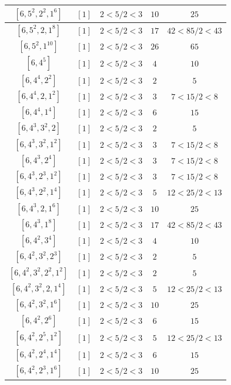 \documentclass{article}%
\begin{document}
\begin{center}
\begin{longtable}{||c|c|c|c|c||}
$[6, 5^{2}, 2^{2}, 1^{6}]$ & $[1]$ & $2 < 5/2 < 3$ & $10$ & $25$ \\ \hline 
$[6, 5^{2}, 2, 1^{8}]$ & $[1]$ & $2 < 5/2 < 3$ & $17$ & $42 < 85/2 < 43$ \\ \hline 
$[6, 5^{2}, 1^{10}]$ & $[1]$ & $2 < 5/2 < 3$ & $26$ & $65$ \\ \hline 
$[6, 4^{5}]$ & $[1]$ & $2 < 5/2 < 3$ & $4$ & $10$ \\ \hline 
$[6, 4^{4}, 2^{2}]$ & $[1]$ & $2 < 5/2 < 3$ & $2$ & $5$ \\ \hline 
$[6, 4^{4}, 2, 1^{2}]$ & $[1]$ & $2 < 5/2 < 3$ & $3$ & $7 < 15/2 < 8$ \\ \hline 
$[6, 4^{4}, 1^{4}]$ & $[1]$ & $2 < 5/2 < 3$ & $6$ & $15$ \\ \hline 
$[6, 4^{3}, 3^{2}, 2]$ & $[1]$ & $2 < 5/2 < 3$ & $2$ & $5$ \\ \hline 
$[6, 4^{3}, 3^{2}, 1^{2}]$ & $[1]$ & $2 < 5/2 < 3$ & $3$ & $7 < 15/2 < 8$ \\ \hline 
$[6, 4^{3}, 2^{4}]$ & $[1]$ & $2 < 5/2 < 3$ & $3$ & $7 < 15/2 < 8$ \\ \hline 
$[6, 4^{3}, 2^{3}, 1^{2}]$ & $[1]$ & $2 < 5/2 < 3$ & $3$ & $7 < 15/2 < 8$ \\ \hline 
$[6, 4^{3}, 2^{2}, 1^{4}]$ & $[1]$ & $2 < 5/2 < 3$ & $5$ & $12 < 25/2 < 13$ \\ \hline 
$[6, 4^{3}, 2, 1^{6}]$ & $[1]$ & $2 < 5/2 < 3$ & $10$ & $25$ \\ \hline 
$[6, 4^{3}, 1^{8}]$ & $[1]$ & $2 < 5/2 < 3$ & $17$ & $42 < 85/2 < 43$ \\ \hline 
$[6, 4^{2}, 3^{4}]$ & $[1]$ & $2 < 5/2 < 3$ & $4$ & $10$ \\ \hline 
$[6, 4^{2}, 3^{2}, 2^{3}]$ & $[1]$ & $2 < 5/2 < 3$ & $2$ & $5$ \\ \hline 
$[6, 4^{2}, 3^{2}, 2^{2}, 1^{2}]$ & $[1]$ & $2 < 5/2 < 3$ & $2$ & $5$ \\ \hline 
$[6, 4^{2}, 3^{2}, 2, 1^{4}]$ & $[1]$ & $2 < 5/2 < 3$ & $5$ & $12 < 25/2 < 13$ \\ \hline 
$[6, 4^{2}, 3^{2}, 1^{6}]$ & $[1]$ & $2 < 5/2 < 3$ & $10$ & $25$ \\ \hline 
$[6, 4^{2}, 2^{6}]$ & $[1]$ & $2 < 5/2 < 3$ & $6$ & $15$ \\ \hline 
$[6, 4^{2}, 2^{5}, 1^{2}]$ & $[1]$ & $2 < 5/2 < 3$ & $5$ & $12 < 25/2 < 13$ \\ \hline 
$[6, 4^{2}, 2^{4}, 1^{4}]$ & $[1]$ & $2 < 5/2 < 3$ & $6$ & $15$ \\ \hline 
$[6, 4^{2}, 2^{3}, 1^{6}]$ & $[1]$ & $2 < 5/2 < 3$ & $10$ & $25$ \\ \hline 

\end{longtable}
\end{center}
\end{document}
